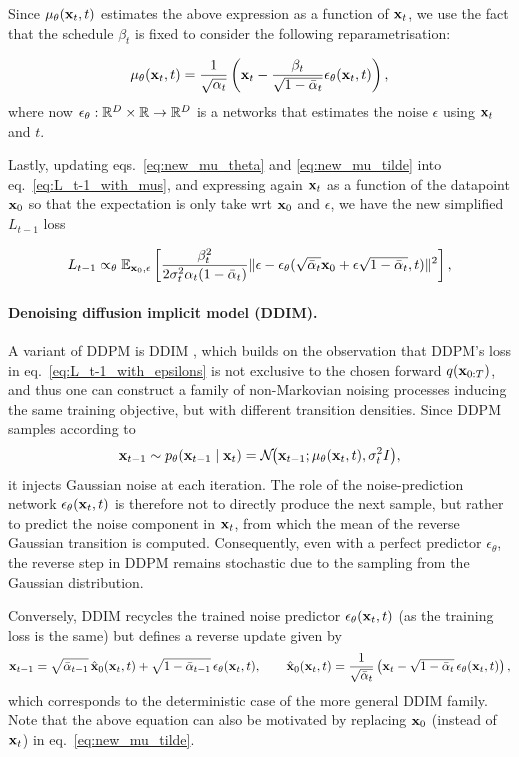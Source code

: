 Since $\mu_\theta({ \mathbf{x}}_t,t)$ estimates the above expression as a function of ${ \mathbf{x}}_t$, we use the fact that the schedule $\beta_t$ is fixed to consider the following reparametrisation: 

\begin{equation}
    \label{eq:new_mu_theta}
    \mu_\theta({ \mathbf{x}}_t,t) = \frac1{\sqrt{\alpha_t}}\left({ \mathbf{x}}_t - \frac{\beta_t}{\sqrt{1-\bar\alpha_t}}\epsilon_\theta({ \mathbf{x}}_t,t)\right),
\end{equation}
where now $\epsilon_\theta:{\mathbb R}^D\times{\mathbb R} \to {\mathbb R}^D$ is a networks that estimates the noise $\epsilon$ using ${ \mathbf{x}}_t$ and $t$.

Lastly, updating eqs.~\eqref{eq:new_mu_theta} and \eqref{eq:new_mu_tilde} into eq.~\eqref{eq:L_t-1_with_mus}, and expressing again ${ \mathbf{x}}_t$ as a function of the datapoint ${ \mathbf{x}}_0$ so that the expectation is only take wrt ${ \mathbf{x}}_0$ and $\epsilon$, we have the new simplified $L_{t-1}$ loss

\begin{equation}
    L_{t-1} \propto_\theta \mathbb{E}_{{ \mathbf{x}}_0,\epsilon}\left[ \frac{\beta_t^2}{2\sigma_t^2\alpha_t (1-\bar\alpha_t) }\| \epsilon - \epsilon_\theta(\sqrt{\bar\alpha_t}{ \mathbf{x}}_0 + \epsilon\sqrt{1-\bar\alpha_t},t) \|^2\right],
    \label{eq:L_t-1_with_epsilons}
\end{equation}

\paragraph{Denoising diffusion implicit model (DDIM).} A variant of DDPM is DDIM \cite{song2021denoising}, which builds on the observation that DDPM's loss in eq.~\eqref{eq:L_t-1_with_epsilons} is not exclusive to the chosen forward $q({ \mathbf{x}}_{0:T})$, and thus one can construct a family of non-Markovian noising processes inducing the same training objective, but with different transition densities. Since DDPM samples according to 
\[
{ \mathbf{x}}_{t-1} \sim p_\theta({ \mathbf{x}}_{t-1}\mid { \mathbf{x}}_t)
= {\mathcal N}\!\bigl({ \mathbf{x}}_{t-1};\mu_\theta({ \mathbf{x}}_t,t),\sigma_t^2 I\bigr),
\]
it injects Gaussian noise at each iteration. The role of the noise-prediction network $\epsilon_\theta({ \mathbf{x}}_t,t)$ is therefore not to directly produce the next sample, but rather to predict the noise component in ${ \mathbf{x}}_t$, from which the mean of the reverse Gaussian transition is computed. Consequently, even with a perfect predictor $\epsilon_\theta$, the reverse step in DDPM remains stochastic due to the sampling from the Gaussian distribution.

Conversely, DDIM recycles the trained noise predictor $\epsilon_\theta({ \mathbf{x}}_t,t)$ (as the training loss is the same) but defines a reverse update given by
\[
{ \mathbf{x}}_{t-1}
=
\sqrt{\bar\alpha_{t-1}}\,\hat{{ \mathbf{x}}}_0({ \mathbf{x}}_t,t)
+
\sqrt{1-\bar\alpha_{t-1}}\,\epsilon_\theta({ \mathbf{x}}_t,t),
\qquad
\hat{{ \mathbf{x}}}_0({ \mathbf{x}}_t,t)
=
\frac{1}{\sqrt{\bar\alpha_t}}
\left({ \mathbf{x}}_t-\sqrt{1-\bar\alpha_t}\,\epsilon_\theta({ \mathbf{x}}_t,t)\right),
\]
which corresponds to the deterministic case of the more general DDIM family. Note that the above equation can also be motivated by replacing ${ \mathbf{x}}_0$ (instead of ${ \mathbf{x}}_t$) in eq.~\eqref{eq:new_mu_tilde}. 

